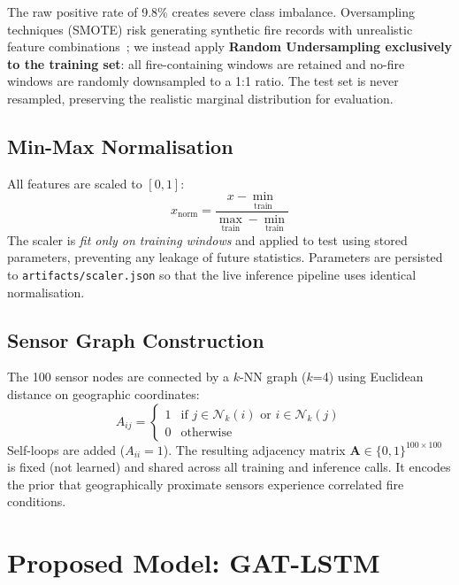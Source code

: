 \documentclass[conference]{IEEEtran}
\begin{document}
The raw positive rate of 9.8\% creates severe class imbalance.
Oversampling techniques (SMOTE) risk generating synthetic fire
records with unrealistic feature combinations~\cite{chawla2002}; we
instead apply \textbf{Random Undersampling exclusively to the training
set}: all fire-containing windows are retained and no-fire windows
are randomly downsampled to a 1:1 ratio. The test set is never
resampled, preserving the realistic marginal distribution for
evaluation.

\subsection{Min-Max Normalisation}

All features are scaled to $[0,1]$:
\begin{equation}
  x_{\text{norm}} =
  \frac{x - \min_{\text{train}}}{\max_{\text{train}} - \min_{\text{train}}}
  \label{eq:minmax}
\end{equation}
The scaler is \emph{fit only on training windows} and applied to test
using stored parameters, preventing any leakage of future statistics.
Parameters are persisted to \texttt{artifacts/scaler.json} so that
the live inference pipeline uses identical normalisation.

\subsection{Sensor Graph Construction}

The 100 sensor nodes are connected by a $k$-NN graph ($k$=4) using
Euclidean distance on geographic coordinates:
\begin{equation}
  A_{ij} = \begin{cases}
    1 & \text{if } j \in \mathcal{N}_k(i) \text{ or } i \in \mathcal{N}_k(j)\\
    0 & \text{otherwise}
  \end{cases}
\end{equation}
Self-loops are added ($A_{ii}=1$). The resulting adjacency matrix
$\mathbf{A}\in\{0,1\}^{100\times100}$ is fixed (not learned) and
shared across all training and inference calls. It encodes the prior that
geographically proximate sensors experience correlated fire conditions.

\section{Proposed Model: GAT-LSTM}
\label{sec:model}
\end{document}
